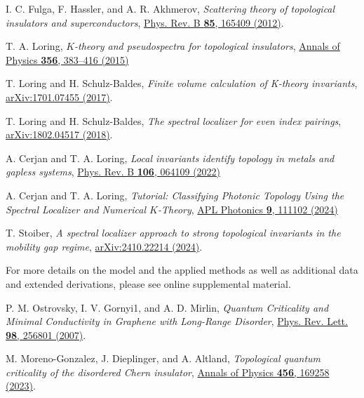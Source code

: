 \documentclass[aps,prb,amsmath,amssymb,twocolumn, superscriptaddress]{revtex4-2}
\begin{document}
\begin{thebibliography}{10}
I. C. Fulga, F. Hassler, and A. R. Akhmerov, {\em Scattering theory of topological insulators and superconductors}, \href{https://journals.aps.org/prb/abstract/10.1103/PhysRevB.85.165409}{Phys. Rev. B {\bfseries 85}, 165409 (2012)}.


T. A. Loring, {\em $K$-theory and pseudospectra for topological insulators}, \href{https://www.sciencedirect.com/science/article/abs/pii/S0003491615000901}{Annals of Physics {\bfseries 356}, 383–416 (2015)}

T. Loring and H. Schulz-Baldes, {\em Finite volume calculation of K-theory invariants}, \href{https://arxiv.org/abs/1701.07455}{arXiv:1701.07455 (2017)}.

T. Loring and H. Schulz-Baldes, {\em The spectral localizer for even index pairings}, \href{https://arxiv.org/abs/1802.04517}{arXiv:1802.04517 (2018)}.

A. Cerjan and T. A. Loring, {\em Local invariants identify topology in metals and gapless systems}, \href{https://journals.aps.org/prb/abstract/10.1103/PhysRevB.106.064109}{Phys. Rev. B {\bfseries 106}, 064109 (2022)}

A. Cerjan and T. A. Loring, {\em Tutorial: Classifying Photonic Topology Using the Spectral Localizer and Numerical $K$-Theory}, \href{https://pubs.aip.org/aip/app/article/9/11/111102/3322376/Classifying-photonic-topology-using-the-spectral}{APL Photonics {\bfseries 9}, 111102 (2024)}

T. Stoiber, {\em A spectral localizer approach to strong topological invariants in the mobility gap regime}, \href{https://arxiv.org/abs/2410.22214}{ arXiv:2410.22214 (2024)}.

For more details on the model and the applied methods as well as additional data and extended derivations, please see online supplemental material.

P. M. Ostrovsky, I. V. Gornyi1, and A. D. Mirlin, {\em Quantum Criticality and Minimal Conductivity in Graphene with Long-Range Disorder}, \href{https://journals.aps.org/prl/abstract/10.1103/PhysRevLett.98.256801}{Phys. Rev. Lett. {\bfseries 98}, 256801 (2007)}.

M. Moreno-Gonzalez, J. Dieplinger, and A. Altland, {\em Topological quantum criticality of the disordered Chern insulator}, \href{https://www.sciencedirect.com/science/article/pii/S000349162300043X?}{Annals of Physics {\bfseries 456}, 169258 (2023)}.


\end{thebibliography}
\end{document}

